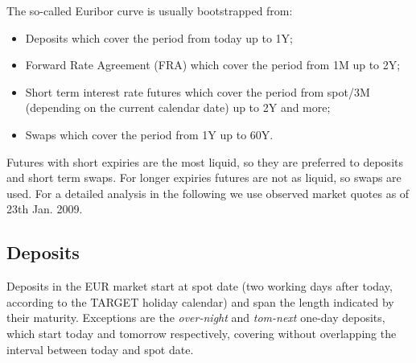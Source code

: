 \documentclass[11pt,reqno]{amsart}
\begin{document}
The so-called Euribor curve is usually bootstrapped from:
\begin{itemize}
\item Deposits which cover the period from today up to 1Y;
\item Forward Rate Agreement (FRA) which cover the period from 1M up to 2Y;
\item Short term interest rate futures which cover the period from spot/3M (depending on the current calendar date) up to 2Y and more;
\item Swaps which cover the period from 1Y up to 60Y.
\end{itemize}

Futures with short expiries are the most liquid, so they are preferred to
deposits and short term swaps. For longer expiries futures are not as liquid, so
swaps are used. For a detailed analysis in the following we use observed market quotes as of
23th Jan. 2009.

\subsection{\label{SecDepo}Deposits}
Deposits in the EUR market start at spot date (two working days after today, according to the TARGET holiday calendar) and span the length indicated by their maturity. Exceptions are the {\it over-night} and {\it tom-next} one-day deposits, which start today and tomorrow respectively, covering without overlapping the interval between today and spot date.
\end{document}
